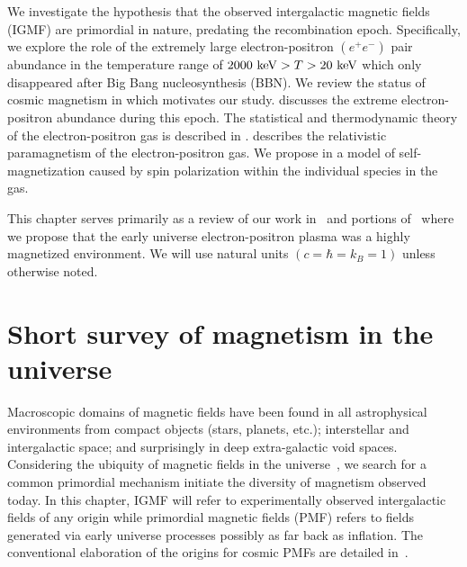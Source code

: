 \noindent We investigate the hypothesis that the observed intergalactic magnetic fields (IGMF) are primordial in nature, predating the recombination epoch. Specifically, we explore the role of the extremely large electron-positron $(e^{+}e^{-})$ pair abundance in the temperature range of $2000\text{ keV}>T>20\text{ keV}$ which only disappeared after Big Bang nucleosynthesis (BBN). We review the status of cosmic magnetism in  which motivates our study.  discusses the extreme electron-positron abundance during this epoch. The statistical and thermodynamic theory of the electron-positron gas is described in .  describes the relativistic paramagnetism of the electron-positron gas. We propose in  a model of self-magnetization caused by spin polarization within the individual species in the gas.

This chapter serves primarily as a review of our work in~\cite{Steinmetz:2023nsc,Steinmetz:2023ucp} and portions of~\cite{Rafelski:2023emw} where we propose that the early universe electron-positron plasma was a highly magnetized environment. We will use natural units $(c=\hbar=k_{B}=1)$ unless otherwise noted.

\section{Short survey of magnetism in the universe}
\label{sec:universe}
\noindent Macroscopic domains of magnetic fields have been found in all astrophysical environments from compact objects (stars, planets, etc.); interstellar and intergalactic space; and surprisingly in deep extra-galactic void spaces. Considering the ubiquity of magnetic fields in the universe~\cite{Giovannini:2017rbc,Giovannini:2003yn,Kronberg:1993vk}, we search for a common primordial mechanism initiate the diversity of magnetism observed today. In this chapter, IGMF will refer to experimentally observed intergalactic fields of any origin while primordial magnetic fields (PMF) refers to fields generated via early universe processes possibly as far back as inflation. The conventional elaboration of the origins for cosmic PMFs are detailed in~\cite{Gaensler:2004gk,Durrer:2013pga,AlvesBatista:2021sln}.

